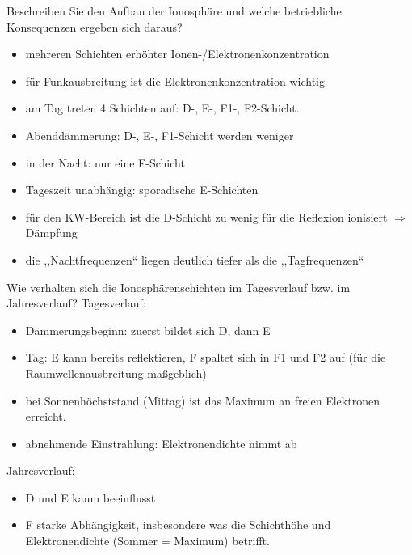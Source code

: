 \documentclass[avery5371,grid,frame,a4paper]{flashcards}
\newcommand{\card}[3]{
  \begin{flashcard}[{\chap} -- #1]{#2}#3\end{flashcard}
}
\begin{document}
\card{21}{Beschreiben Sie den Aufbau der Ionosphäre und welche betriebliche Konsequenzen ergeben sich daraus?}{
  \footnotesize
  \begin{minipage}{0.49\textwidth}
    \begin{itemize}
      \item mehreren Schichten erhöhter Ionen-/Elektronenkonzentration
      \item für Funkausbreitung ist die Elektronenkonzentration wichtig
      \item am Tag treten 4 Schichten auf: D-, E-, F1-, F2-Schicht.
      \item Abenddämmerung: D-, E-, F1-Schicht werden weniger
    \end{itemize}
  \end{minipage}
  \begin{minipage}{0.5\textwidth}
    \begin{itemize}
      \item in der Nacht: nur eine F-Schicht
      \item Tageszeit unabhängig: sporadische E-Schichten
      \item für den KW-Bereich ist die D-Schicht zu wenig für die Reflexion ionisiert $\Rightarrow$ Dämpfung
      \item die ,,Nachtfrequenzen`` liegen deutlich tiefer als die ,,Tagfrequenzen``
    \end{itemize}
  \end{minipage}
}
\card{22}{Wie verhalten sich die Ionosphärenschichten im Tagesverlauf bzw. im Jahresverlauf?}{
  \footnotesize
  Tagesverlauf:
  \begin{itemize}
    \item Dämmerungsbeginn: zuerst bildet sich D, dann E
    \item Tag: E kann bereits reflektieren, F spaltet sich in F1 und F2  auf (für die Raumwellenausbreitung maßgeblich)
    \item bei Sonnenhöchststand (Mittag) ist das Maximum an freien Elektronen erreicht.
    \item abnehmende Einstrahlung: Elektronendichte nimmt ab
  \end{itemize}

  Jahresverlauf:
  \begin{itemize}
    \item D und E kaum beeinflusst
    \item F starke Abhängigkeit, insbesondere was die Schichthöhe und Elektronendichte (Sommer = Maximum) betrifft.
  \end{itemize}
}
\end{document}
